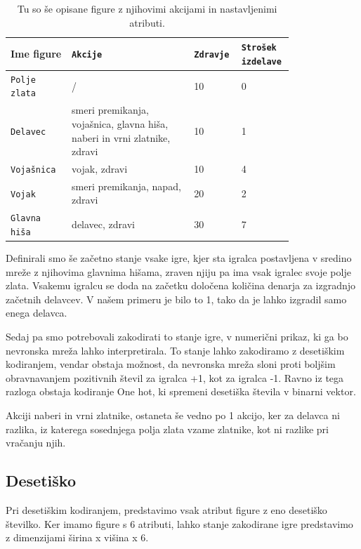 \documentclass[a4paper, 12pt]{book}
\begin{document}
\begin{table}

	\begin{center}
		
	\begin{tabular}{p{0.2\linewidth}|p{0.4\linewidth}|p{0.1\linewidth}|p{0.1\linewidth}}
		Ime figure & {\tt Akcije} & {\tt Zdravje} & {\tt Strošek izdelave} \\ \hline
		{\tt Polje zlata} & / & 10 & 0 \\
		{\tt Delavec}   & smeri premikanja, vojašnica, glavna hiša, naberi in vrni zlatnike, zdravi & 10  & 1 \\
		{\tt Vojašnica}   & vojak, zdravi & 10  & 4 \\
		{\tt Vojak}   & smeri premikanja, napad, zdravi  & 20 & 2 \\
		{\tt Glavna hiša}   & delavec, zdravi & 30  & 7 \\
	\end{tabular}
	\end{center}
	\caption{Tu so še opisane figure z njihovimi akcijami in nastavljenimi atributi.}
	\label{tabelfigures}
\end{table}

Definirali smo še začetno stanje vsake igre, kjer sta igralca postavljena v sredino mreže z njihovima glavnima hišama, zraven njiju pa ima vsak igralec svoje polje zlata. Vsakemu igralcu se doda na začetku določena količina denarja za izgradnjo začetnih delavcev. V našem primeru je bilo to 1, tako da je lahko izgradil samo enega delavca.

Sedaj pa smo potrebovali zakodirati to stanje igre, v numerični prikaz, ki ga bo nevronska mreža lahko interpretirala. 
To stanje lahko zakodiramo z desetiškim kodiranjem, vendar obstaja možnost, da nevronska mreža sloni proti boljšim obravnavanjem pozitivnih števil za igralca +1, kot za igralca -1. 
Ravno iz tega razloga obstaja kodiranje One hot, ki spremeni desetiška števila v binarni vektor.

Akciji naberi in vrni zlatnike, ostaneta še vedno po 1 akcijo, ker za delavca ni razlika, iz katerega sosednjega polja zlata vzame zlatnike, kot ni razlike pri vračanju njih.

\subsection{Desetiško}
Pri desetiškim kodiranjem, predstavimo vsak atribut figure z eno desetiško številko.
Ker imamo figure s 6 atributi, lahko stanje zakodirane igre predstavimo z dimenzijami širina x višina x 6.
\end{document}
